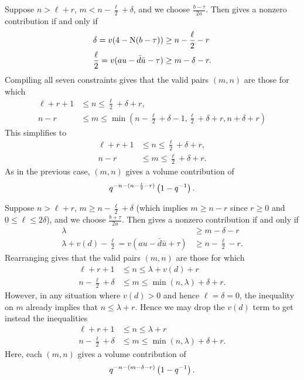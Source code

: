 \begin{description}
Suppose $n > \ell + r$,
$m < n - \frac{\ell}{2} + \delta$, and we choose $\frac{b-\tau}{2a}$.
Then  gives a nonzero contribution if and only if
\begin{align*}
  \delta = v(4-\operatorname{N}(b-\tau)) &\geq n - \frac{\ell}{2} - r \\
  \frac{\ell}{2} = v(au-\bar d \bar u - \tau) & \geq m - \delta - r.
\end{align*}
Compiling all seven constraints gives that the valid pairs $(m,n)$ are those for which
\begin{align*}
  \ell + r + 1 &\leq n \leq \frac{\ell}{2}+\delta+r, \\
  n-r &\leq m \leq \min\left( n - \frac{\ell}{2}+\delta - 1,
    \frac{\ell}{2} + \delta + r, n + \delta + r \right)
\end{align*}
This simplifies to
\begin{equation}
  \begin{aligned}
    \ell+r+1 &\leq n \leq \frac{\ell}{2}+\delta+r, \\
    n-r &\leq m \leq \frac{\ell}{2} + \delta + r.
  \end{aligned}
  \label{eq:even_case3_minus}
\end{equation}
As in the previous case, $(m,n)$ gives a volume contribution of
\[ q^{-n - (n - \frac{\ell}{2} - r)} \left( 1 - q^{-1} \right). \]

Suppose $n > \ell + r$,
$m \ge n - \frac{\ell}{2} + \delta$
(which implies $m \ge n-r$ since $r \ge 0$ and $0 \le \ell \le 2 \delta$),
and we choose $\frac{b+\tau}{2a}$.
Then  gives a nonzero contribution if and only if
\begin{align*}
  \lambda &\geq m - \delta - r \\
  \lambda + v(d) - \frac{\ell}{2} = v(au-\bar d \bar u + \tau) & \geq n - \frac{\ell}{2} - r.
\end{align*}
Rearranging gives that the valid pairs $(m,n)$ are those for which
\begin{align*}
  \ell + r + 1 &\leq n \leq \lambda + v(d) + r \\
  n - \frac{\ell}{2} + \delta &\leq m \leq \min(n, \lambda) + \delta + r.
\end{align*}
However, in any situation where $v(d) > 0$ and hence $\ell = \delta = 0$,
the inequality on $m$ already implies that $n \le \lambda + r$.
Hence we may drop the $v(d)$ term to get instead the inequalities
\begin{equation}
  \begin{aligned}
    \ell + r + 1 &\leq n \leq \lambda + r \\
    n - \frac{\ell}{2} + \delta &\leq m \leq \min(n, \lambda) + \delta + r.
  \end{aligned}
  \label{eq:even_case4_plus}
\end{equation}
Here, each $(m,n)$ gives a volume contribution of
\[ q^{-n - (m - \delta - r)} \left( 1 - q^{-1} \right). \]


\end{description}
